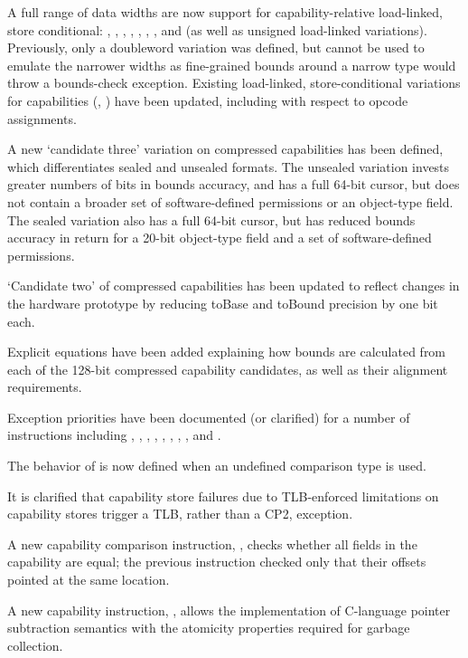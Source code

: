 \begin{description}
  A full range of data widths are now support for capability-relative
  load-linked, store conditional: , ,
  , , ,
  , , and  (as well as
  unsigned load-linked variations).
  Previously, only a doubleword variation was defined, but cannot be used to
  emulate the narrower widths as fine-grained bounds around a narrow type
  would throw a bounds-check exception.
  Existing load-linked, store-conditional variations for capabilities
  (, ) have been updated, including with
  respect to opcode assignments.

  A new `candidate three' variation on compressed capabilities has been
  defined, which differentiates sealed and unsealed formats.
  The unsealed variation invests greater numbers of bits in bounds accuracy,
  and has a full 64-bit cursor, but does not contain a broader set of
  software-defined permissions or an object-type field.
  The sealed variation also has a full 64-bit cursor, but has reduced bounds
  accuracy in return for a 20-bit object-type field and a set of
  software-defined permissions.

  `Candidate two' of compressed capabilities has been updated to reflect
  changes in the hardware prototype by reducing toBase and toBound precision
  by one bit each.

  Explicit equations have been added explaining how bounds are calculated
  from each of the 128-bit compressed capability candidates, as well as their
  alignment requirements.

  Exception priorities have been documented (or clarified) for a number of
  instructions including , ,
  , , ,
  , , , and
  .

  The behavior of  is now defined when an undefined
  comparison type is used.

  It is clarified that capability store failures due to TLB-enforced
  limitations on capability stores trigger a TLB, rather than a CP2,
  exception.

  A new capability comparison instruction, , checks
  whether all fields in the capability are equal; the previous
   instruction checked only that their offsets pointed at the
  same location.

  A new capability instruction, , allows the implementation
  of C-language pointer subtraction semantics with the atomicity properties
  required for garbage collection.


\end{description}
